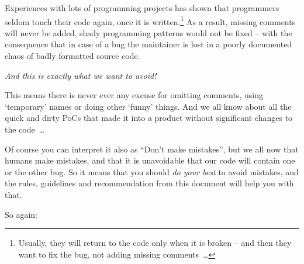 \begin{center}
\begin{huge}
\end{huge}
\end{center}

Experiences with lots of programming projects has shown that programmers seldom touch their code again, once it is written.\footnote{Usually, they will return to the code only when it is broken – and then they want to fix the bug, not adding missing comments~…} As a result, missing comments will never be added, shady programming patterns would not be fixed – with the consequence that in case of a bug the maintainer is lost in a poorly documented chaos of badly formatted source code.

\textit{And this is exactly what we want to avoid!} 

This means there is never ever any excuse for omitting comments, using ‘temporary’ names or doing other ‘funny’ things. And we all know about all the quick and dirty PoCs that made it into a product without significant changes to the code~…

Of course you can interpret it also as “Don't make mistakes”, but we all now that humans make mistakes, and that it is unavoidable that our code will contain one or the other bug. So it means that you should \textit{do your best} to avoid mistakes, and the rules, guidelines and recommendation from this document will help you with that.

So again:

\begin{center}
\begin{huge}
\end{huge}
\end{center}
